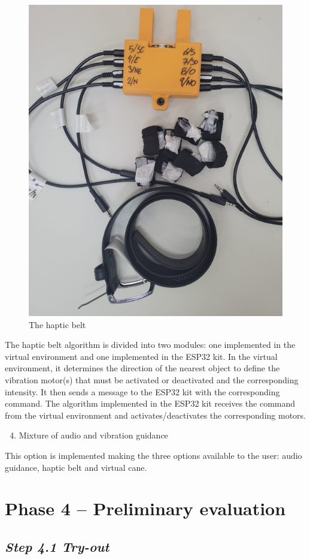         \begin{figure}[!htb]
            \centering
            \includegraphics[width = 0.5\linewidth]{Metodologia/Cinto Haptico.png}
            \caption{The haptic belt}
            \label{fig:cinto_haptico}
        \end{figure}

        The haptic belt algorithm is divided into two modules: one implemented in the virtual environment and one implemented in the ESP32 kit. In the virtual environment, it determines the direction of the nearest object to define the vibration motor(s) that must be activated or deactivated and the corresponding intensity. It then sends a message to the ESP32 kit with the corresponding command. The algorithm implemented in the ESP32 kit receives the command from the virtual environment and activates/deactivates the corresponding motors.

        \begin{enumerate} [label = \Alph*)]
            \setcounter{enumi}{3}
            \item Mixture of audio and vibration guidance
        \end{enumerate}

        This option is implemented making the three options available to the user: audio guidance, haptic belt and virtual cane. 


\section{Phase 4 – Preliminary evaluation}
\label{sec:tests_phase}
        
\subsection*{\textit{Step 4.1 Try-out}}

